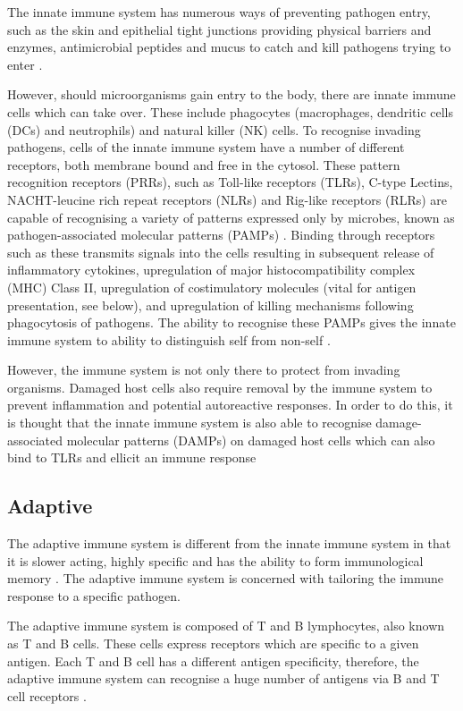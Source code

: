The innate immune system has numerous ways of preventing pathogen entry, such as the skin and epithelial tight junctions providing physical barriers and enzymes, antimicrobial peptides and mucus to catch and kill pathogens trying to enter \citep{Janeway2001, Parkin2001}.

However, should microorganisms gain entry to the body, there are innate immune cells which can take over.
These include phagocytes (macrophages, dendritic cells (DCs) and neutrophils) and natural killer (NK) cells. 
To recognise invading pathogens, cells of the innate immune system have a number of different receptors, both membrane bound and free in the cytosol.
These pattern recognition receptors (PRRs), such as Toll-like receptors (TLRs), C-type Lectins, NACHT-leucine rich repeat receptors (NLRs) and Rig-like receptors (RLRs) are capable of recognising a variety of patterns expressed only by microbes, known as pathogen-associated molecular patterns (PAMPs) \citep{Medzhitov2000, Iwasaki2004}.
Binding through receptors such as these transmits signals into the cells resulting in subsequent release of inflammatory cytokines, upregulation of major histocompatibility complex (MHC) Class II, upregulation of costimulatory molecules (vital for antigen presentation, see below), and upregulation of killing mechanisms following phagocytosis of pathogens.
The ability to recognise these PAMPs gives the innate immune system to ability to distinguish self from non-self \citep{Medzhitov2000}.

However, the immune system is not only there to protect from invading organisms. 
Damaged host cells also require removal by the immune system  to prevent inflammation and potential autoreactive responses. 
In order to do this, it is thought that the innate immune system is also able to recognise damage-associated molecular patterns (DAMPs) on damaged host cells which can also bind to TLRs and ellicit an immune response \citep{Matzinger1994, Shin2015}

\subsection{Adaptive}

The adaptive immune system is different from the innate immune system in that it is slower acting, highly specific and has the ability to form immunological memory \citep{Parkin2001}.
The adaptive immune system is concerned with tailoring the immune response to a specific pathogen.

The adaptive immune system is composed of T and B lymphocytes, also known as T and B cells.
These cells express receptors which are specific to a given antigen.
Each T and B cell has a different antigen specificity, therefore, the adaptive immune system can recognise a huge number of antigens via B and T cell receptors \citep{Janeway2001}.

